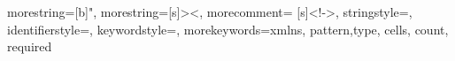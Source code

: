 \usepackage{listings}


\usepackage[ruled,linesnumbered]{algorithm2e}

\usepackage{tabularx}

\usepackage{pdfpages}
\usepackage{float}




{
  morestring=[b]",
  morestring=[s]{>}{<},
  morecomment= [s]{<!}{->},
  stringstyle=\color{black},
  identifierstyle=\color{blue},
  keywordstyle=\color{orange},
  morekeywords={xmlns, pattern,type, cells, count, required} %
}




